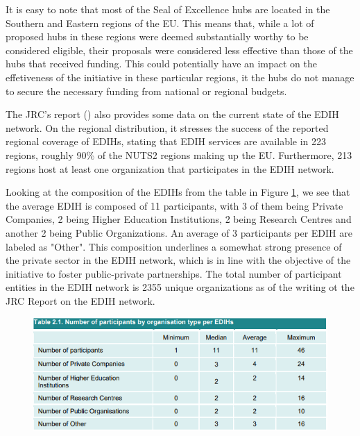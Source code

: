\documentclass[12pt]{report}
\begin{document}
\par It is easy to note that most of the Seal of Excellence hubs are located in the Southern and Eastern regions of the EU. This means that, while a lot of proposed hubs in these regions were deemed substantially worthy to be considered eligible, their proposals were considered less effective than those of the hubs that received funding. This could potentially have an impact on the effetiveness of the initiative in these particular regions, it the hubs do not manage to secure the necessary funding from national or regional budgets.

\par The JRC's report (\cite{jrc_edihreport}) also provides some data on the current state of the EDIH network. On the regional distribution, it stresses the success of the reported regional coverage of EDIHs, stating that EDIH services are available in 223 regions, roughly 90\% of the NUTS2 regions making up the EU. Furthermore, 213 regions host at least one organization that participates in the EDIH network. 

\par Looking at the composition of the EDIHs from the table in Figure \ref{fig:edih-composition-table}, we see that the average EDIH is composed of 11 participants, with 3 of them being Private Companies, 2 being Higher Education Institutions, 2 being Research Centres and another 2 being Public Organizations. An average of 3 participants per EDIH are labeled as "Other". This composition underlines a somewhat strong presence of the private sector in the EDIH network, which is in line with the objective of the initiative to foster public-private partnerships. The total number of participant entities in the EDIH network is 2355 unique organizations as of the writing ot the JRC Report on the EDIH network.

\begin{figure}[h]
    \centering
    \includegraphics[width=1\linewidth]{Figures/05-edihcomposition.png}
    \caption{}
    \label{fig:edih-composition-table}
\end{figure}
\end{document}
